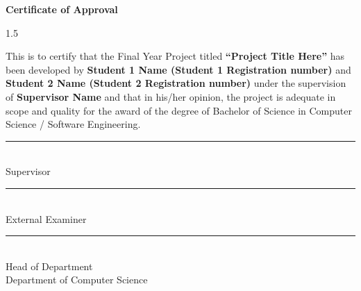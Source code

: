 

\newpage
\thispagestyle{empty}

\begin{center}
\textbf{\LARGE Certificate of Approval}
\end{center}

\vspace{1.5cm}

\begin{spacing}{1.5}

This is to certify that the Final Year Project titled 
\textbf{``Project Title Here''} 
has been developed by \textbf{Student 1 Name (Student 1 Registration number)} and \textbf{Student 2 Name (Student 2 Registration number)} under the supervision of \textbf{Supervisor Name} and that in his/her opinion, the project is adequate in scope and quality for the award of the degree of  Bachelor of Science in Computer Science / Software Engineering.

\end{spacing}

\vspace{2.5cm}
\noindent\rule{6cm}{0.4pt}  
\\ 
Supervisor

\vspace{2.5cm}
\noindent\rule{6cm}{0.4pt}  
\\ 
External Examiner

\vspace{2.5cm}

\noindent\rule{6cm}{0.4pt}  
\\ 
Head of Department  
\\ 
Department of Computer Science

\newpage
